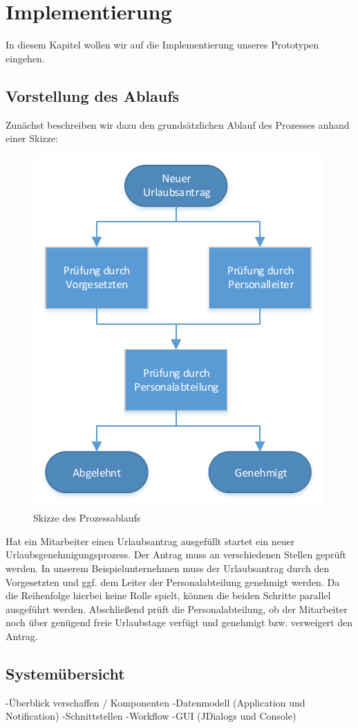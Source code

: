 \section{Implementierung}
In diesem Kapitel wollen wir auf die Implementierung unseres Prototypen eingehen.


\subsection{Vorstellung des Ablaufs}
Zunächst beschreiben wir dazu den grundsätzlichen Ablauf des Prozesses anhand einer Skizze:
\begin{figure}[H]
\centering
\includegraphics[width=0.5\linewidth]{Bilder/Workflow}
\caption{Skizze des Prozessablaufs}
\label{fig:Workflow}
\end{figure}

Hat ein Mitarbeiter einen Urlaubsantrag ausgefüllt startet ein neuer Urlaubsgenehmigungsprozess. Der Antrag muss an verschiedenen Stellen geprüft werden. In unserem Beispielunternehmen muss der Urlaubsantrag durch den Vorgesetzten und ggf. dem Leiter der Personalabteilung genehmigt werden. Da die Reihenfolge hierbei keine Rolle spielt, können die beiden Schritte parallel ausgeführt werden. Abschließend prüft die Personalabteilung, ob der Mitarbeiter noch über genügend freie Urlaubstage verfügt und genehmigt bzw. verweigert den Antrag.	
	
	
\subsection{Systemübersicht}
	-Überblick verschaffen / Komponenten
		-Datenmodell (Application und Notification)
		-Schnittstellen
		-Workflow
		-GUI (JDialogs und Console)


